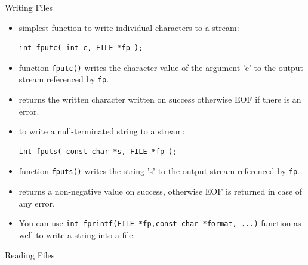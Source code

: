 \documentclass[10pt,t]{beamer}
\begin{document}
\begin{frame}[fragile]{Writing Files}
  \begin{itemize}
  \item  simplest function to write individual characters to a stream:
    \begin{lstlisting}[basicstyle=\scriptsize\ttfamily]
      int fputc( int c, FILE *fp );
    \end{lstlisting}
  \item function \lstinline[basicstyle=\scriptsize\ttfamily]|fputc()| writes the character value of the argument 'c' to the output stream referenced by \lstinline[basicstyle=\scriptsize\ttfamily]|fp|.
  \item returns the written character written on success otherwise EOF if there is an error.
  \item to write a null-terminated string to a stream:
    \begin{lstlisting}[basicstyle=\scriptsize\ttfamily]
      int fputs( const char *s, FILE *fp );
    \end{lstlisting}
  \item function \lstinline[basicstyle=\scriptsize\ttfamily]|fputs()| writes the string 's' to the output stream referenced by \lstinline[basicstyle=\scriptsize\ttfamily]|fp|.
  \item returns a non-negative value on success, otherwise EOF is returned in case of any error.
  \item You can use \lstinline[basicstyle=\scriptsize\ttfamily]|int fprintf(FILE *fp,const char *format, ...)| function as well to write a string into a file.
  \end{itemize}
\end{frame}

\begin{frame}[fragile]{Reading Files}
\end{frame}
\end{document}
